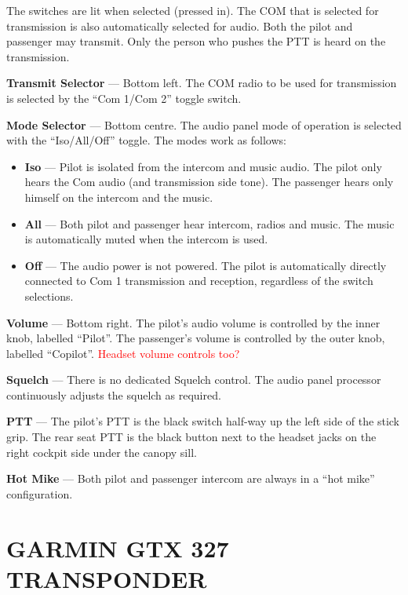 The switches are lit when selected (pressed in). The COM that is selected for transmission is also automatically selected for audio. Both the pilot and passenger may transmit. Only the person who pushes the PTT is heard on the transmission.

\textbf{Transmit Selector} --- Bottom left. The COM radio to be used for transmission is selected by the ``Com 1/Com 2'' toggle switch.

\textbf{Mode Selector} --- Bottom centre. The audio panel mode of operation is selected with the ``Iso/All/Off'' toggle. The modes work as follows: 
\begin{itemize}
\item \textbf{Iso} --- Pilot is isolated from the intercom and music audio. The pilot only hears the Com audio (and transmission side tone). The passenger hears only himself on the intercom and the music. 
\item \textbf{All} --- Both pilot and passenger hear intercom, radios and music. The music is automatically muted when the intercom is used. 
\item \textbf{Off} --- The audio power is not powered. The pilot is automatically directly connected to Com 1 transmission and reception, regardless of the switch selections. 
\end{itemize}

\textbf{Volume} --- Bottom right. The pilot's audio volume is controlled by the inner knob, labelled ``Pilot''. The passenger's volume is controlled by the outer knob, labelled ``Copilot''. \textcolor{red}{Headset volume controls too?}

\textbf{Squelch} --- There is no dedicated Squelch control. The audio panel processor continuously adjusts the squelch as required.

\textbf{PTT} --- The pilot's PTT is the black switch half-way up the left side of the stick grip. The rear seat PTT is the black button next to the headset jacks on the right cockpit side under the canopy sill.

\textbf{Hot Mike} --- Both pilot and passenger intercom are always in a ``hot mike'' configuration. 

\section{GARMIN GTX 327 TRANSPONDER}

